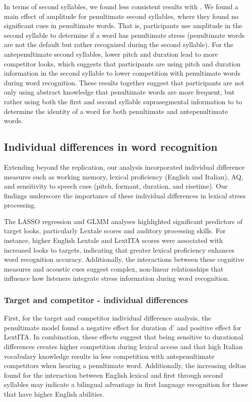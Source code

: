In terms of second syllables, we found less consistent results with \cite{Sulpizio_McQueen_2012}. We found a main effect of amplitude for penultimate second syllables, where they found no significant cues in penultimate words. That is, participants use amplitude in the second syllable to determine if a word has penultimate stress (penultimate words are not the default but rather recognized during the second syllable). For the antepenultimate second syllables, lower pitch and duration lead to more competitor looks, which suggests that participants are using pitch and duration information in the second syllable to lower competition with penultimate words during word recognition. These results together suggest that participants are not only using abstract knowledge that penultimate words are more frequent, but rather using both the first and second syllable suprasegmental information to to determine the identity of a word for both penultimate and antepenultimate words.

\subsection{Individual differences in word recognition}
Extending beyond the replication, our analysis incorporated individual difference measures such as working memory, lexical proficiency (English and Italian), AQ, and sensitivity to speech cues (pitch, formant, duration, and risetime). Our findings underscore the importance of these individual differences in lexical stress processing.

The LASSO regression and GLMM analyses highlighted significant predictors of target looks, particularly Lextale scores and auditory processing skills. For instance, higher English Lextale and LextITA scores were associated with increased looks to targets, indicating that greater lexical proficiency enhances word recognition accuracy. Additionally, the interactions between these cognitive measures and acoustic cues suggest complex, non-linear relationships that influence how listeners integrate stress information during word recognition.


\subsubsection{Target and competitor - individual differences}
First, for the target and competitor individual difference analysis, the penultimate model found a negative effect for duration d' and positive effect for LextITA. In combination, these effects suggest that being sensitive to durational differences creates higher competition during lexical access and that high Italian vocabulary knowledge results in less competition with antepenultimate competitors when hearing a penultimate word. Additionally, the increasing deltas found for the interaction between English lexical and first through second syllables may indicate a bilingual advantage in first language recognition for those that have higher English abilities. 

